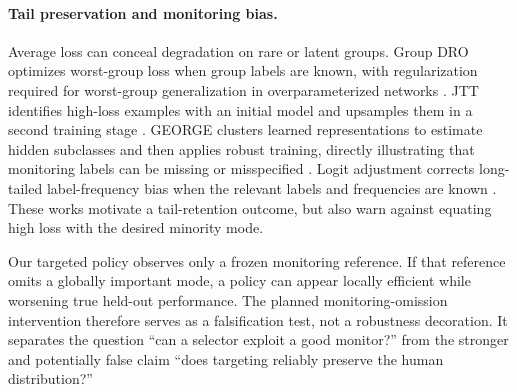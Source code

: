 \paragraph{Tail preservation and monitoring bias.}
Average loss can conceal degradation on rare or latent groups. Group DRO optimizes worst-group loss when group labels are known, with regularization required for worst-group generalization in overparameterized networks \cite{sagawa2020groupdro}. JTT identifies high-loss examples with an initial model and upsamples them in a second training stage \cite{liu2021jtt}. GEORGE clusters learned representations to estimate hidden subclasses and then applies robust training, directly illustrating that monitoring labels can be missing or misspecified \cite{sohoni2020george}. Logit adjustment corrects long-tailed label-frequency bias when the relevant labels and frequencies are known \cite{menon2021logit}. These works motivate a tail-retention outcome, but also warn against equating high loss with the desired minority mode.

Our targeted policy observes only a frozen monitoring reference. If that reference omits a globally important mode, a policy can appear locally efficient while worsening true held-out performance. The planned monitoring-omission intervention therefore serves as a falsification test, not a robustness decoration. It separates the question ``can a selector exploit a good monitor?'' from the stronger and potentially false claim ``does targeting reliably preserve the human distribution?''
